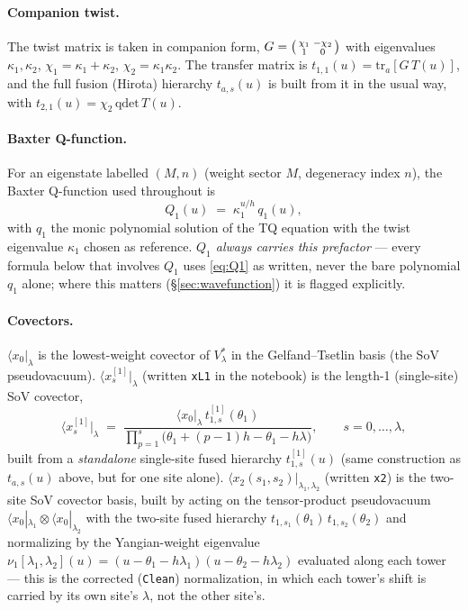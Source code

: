 \documentclass[11pt]{article}
\begin{document}
\paragraph{Companion twist.} The twist matrix is taken in companion form,
$G=\begin{psmallmatrix}\chi_1&-\chi_2\\1&0\end{psmallmatrix}$ with eigenvalues $\kappa_1,\kappa_2$,
$\chi_1=\kappa_1+\kappa_2$, $\chi_2=\kappa_1\kappa_2$. The transfer matrix is
$t_{1,1}(u)=\mathrm{tr}_a[G\,T(u)]$, and the full fusion (Hirota) hierarchy $t_{a,s}(u)$ is built
from it in the usual way, with $t_{2,1}(u)=\chi_2\,\mathrm{qdet}\,T(u)$.

\paragraph{Baxter Q-function.} For an eigenstate labelled $(M,n)$ (weight sector $M$, degeneracy
index $n$), the Baxter Q-function used throughout is
\begin{equation}
  Q_1(u) \;=\; \kappa_1^{u/h}\, q_1(u),
  \label{eq:Q1}
\end{equation}
with $q_1$ the monic polynomial solution of the TQ equation with the twist eigenvalue $\kappa_1$
chosen as reference. \emph{$Q_1$ always carries this prefactor} --- every formula below that
involves $Q_1$ uses \eqref{eq:Q1} as written, never the bare polynomial $q_1$ alone; where this
matters (\S\ref{sec:wavefunction}) it is flagged explicitly.

\paragraph{Covectors.} $\langle x_0|_\lambda$ is the lowest-weight covector of $V_\lambda^*$ in the
Gelfand--Tsetlin basis (the SoV pseudovacuum). $\langle x^{[1]}_s|_\lambda$ (written \texttt{xL1} in
the notebook) is the length-1 (single-site) SoV covector,
\begin{equation}
  \langle x^{[1]}_s|_\lambda \;=\; \frac{\langle x_0|_\lambda\, t^{[1]}_{1,s}(\theta_1)}
  {\prod_{p=1}^{s}\bigl(\theta_1+(p-1)h-\theta_1-h\lambda\bigr)},
  \qquad s=0,\dots,\lambda,
  \label{eq:xL1}
\end{equation}
built from a \emph{standalone} single-site fused hierarchy $t^{[1]}_{1,s}(u)$ (same construction as
$t_{a,s}(u)$ above, but for one site alone). $\langle x_2(s_1,s_2)|_{\lambda_1,\lambda_2}$ (written
\texttt{x2}) is the two-site SoV covector basis, built by acting on the tensor-product pseudovacuum
$\langle x_0|_{\lambda_1}\otimes\langle x_0|_{\lambda_2}$ with the two-site fused hierarchy
$t_{1,s_1}(\theta_1)\,t_{1,s_2}(\theta_2)$ and normalizing by the Yangian-weight eigenvalue
$\nu_1[\lambda_1,\lambda_2](u)=(u-\theta_1-h\lambda_1)(u-\theta_2-h\lambda_2)$ evaluated along each
tower --- this is the corrected (\texttt{Clean}) normalization, in which each tower's shift is
carried by its own site's $\lambda$, not the other site's.
\end{document}
